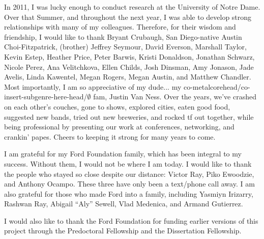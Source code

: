 {  In 2011, I was lucky enough to conduct research at the University of Notre Dame. Over that Summer, and throughout the next year, I was able to develop strong relationships with many of my colleagues. Therefore, for their wisdom and friendship, I would like to thank Bryant Crubaugh,  San Diego-native Austin Choi-Fitzpatrick, (brother) Jeffrey Seymour, David Everson, Marshall Taylor, Kevin Estep, Heather Price, Peter Barwis, Kristi Donaldson, Jonathan Schwarz, Nicole Perez, Ana Velitchkova, Ellen Childs, Josh Dinsman, Amy Jonason, Jade Avelis, Linda Kawentel, Megan Rogers, Megan Austin, and Matthew Chandler. Most importantly, I am so appreciative of my dude... my co-metalcorehead/co-insert-subgenre-here-head/$\emptyset$ fam, Justin Van Ness. Over the years, we've crashed on each other's couches, gone to shows, explored cities, eaten good food, suggested new bands, tried out new breweries, and rocked tf out together, while being professional by presenting our work at conferences, networking, and crankin' papes. Cheers to keeping it strong for many years to come.
  
I am grateful for my Ford Foundation family, which has been integral to my success. Without them, I would not be where I am today. I would like to thank the people who stayed so close despite our distance: Victor Ray, Piko Ewoodzie, and Anthony Ocampo. These three have only been a text/phone call away. I am also grateful for those who made Ford into a family, including Yasmiyn Irizarry, Rashwan Ray, Abigail ``Aly'' Sewell, Vlad Medenica, and Armand Gutierrez.
  
  
  
  
  I would also like to thank the Ford Foundation for funding earlier versions of this project through the Predoctoral Fellowship and the Dissertation Fellowship. 
  
}


